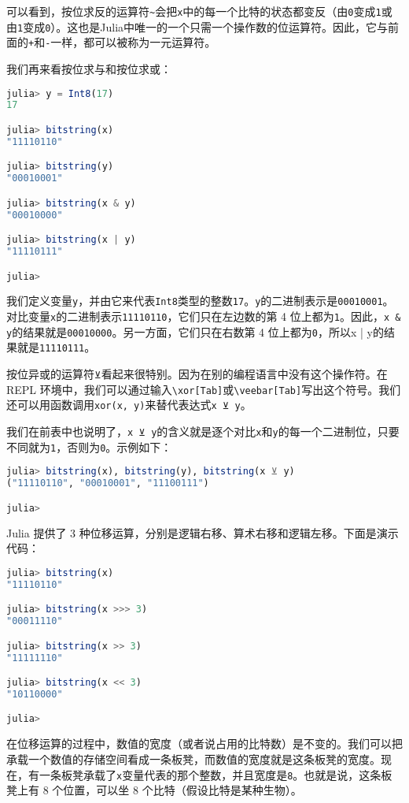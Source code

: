 可以看到，按位求反的运算符\verb|~|会把\verb|x|中的每一个比特的状态都变反（由\verb|0|变成\verb|1|或由\verb|1|变成\verb|0|）。这也是Julia中唯一的一个只需一个操作数的位运算符。因此，它与前面的\verb|+|和\verb|-|一样，都可以被称为一元运算符。

我们再来看按位求与和按位求或：
\begin{lstlisting}[language=julia]
julia> y = Int8(17)
17

julia> bitstring(x)
"11110110"

julia> bitstring(y)
"00010001"

julia> bitstring(x & y)
"00010000"

julia> bitstring(x | y)
"11110111"

julia>
\end{lstlisting}

我们定义变量\verb|y|，并由它来代表\verb|Int8|类型的整数\verb|17|。\verb|y|的二进制表示是\verb|00010001|。对比变量\verb|x|的二进制表示\verb|11110110|，它们只在左边数的第 4 位上都为\verb|1|。因此，\verb|x & y|的结果就是\verb|00010000|。另一方面，它们只在右数第 4 位上都为\verb|0|，所以x | y的结果就是\verb|11110111|。

按位异或的运算符\verb|⊻|看起来很特别。因为在别的编程语言中没有这个操作符。在 REPL 环境中，我们可以通过输入\verb|\xor[Tab]|或\verb|\veebar[Tab]|写出这个符号。我们还可以用函数调用\verb|xor(x, y)|来替代表达式\verb|x ⊻ y|。

我们在前表中也说明了，\verb|x ⊻ y|的含义就是逐个对比\verb|x|和\verb|y|的每一个二进制位，只要不同就为\verb|1|，否则为\verb|0|。示例如下：
\begin{lstlisting}[language=julia]
julia> bitstring(x), bitstring(y), bitstring(x ⊻ y)
("11110110", "00010001", "11100111")

julia> 
\end{lstlisting}

Julia 提供了 3 种位移运算，分别是逻辑右移、算术右移和逻辑左移。下面是演示代码：
\begin{lstlisting}[language=julia]
julia> bitstring(x)
"11110110"

julia> bitstring(x >>> 3)
"00011110"

julia> bitstring(x >> 3)
"11111110"

julia> bitstring(x << 3)
"10110000"

julia>
\end{lstlisting}

在位移运算的过程中，数值的宽度（或者说占用的比特数）是不变的。我们可以把承载一个数值的存储空间看成一条板凳，而数值的宽度就是这条板凳的宽度。现在，有一条板凳承载了\verb|x|变量代表的那个整数，并且宽度是\verb|8|。也就是说，这条板凳上有 8 个位置，可以坐 8 个比特（假设比特是某种生物）。


